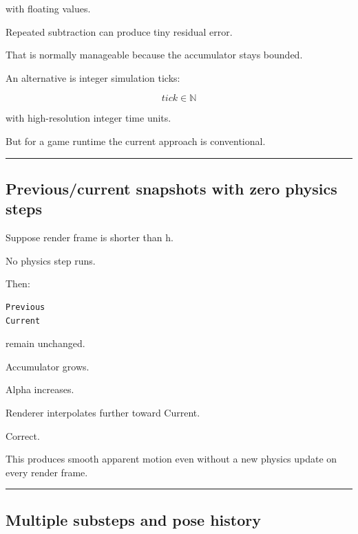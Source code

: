 with floating values.

Repeated subtraction can produce tiny residual error.

That is normally manageable because the accumulator stays bounded.

An alternative is integer simulation ticks:

\[
tick\in\mathbb N
\]

with high-resolution integer time units.

But for a game runtime the current approach is conventional.

\begin{center}\rule{0.5\linewidth}{0.5pt}\end{center}

\subsection{Previous/current snapshots with zero physics steps}\label{06-engine-ii-ch038-previouscurrent-snapshots-with-zero-physics-steps}

\hypertarget{06-engine-ii-ch038-previouscurrent-snapshots-with-zero-physics-steps}{}

Suppose render frame is shorter than h.

No physics step runs.

Then:

\begin{verbatim}
Previous
Current
\end{verbatim}

remain unchanged.

Accumulator grows.

Alpha increases.

Renderer interpolates further toward Current.

Correct.

This produces smooth apparent motion even without a new physics update on every render frame.

\begin{center}\rule{0.5\linewidth}{0.5pt}\end{center}

\subsection{Multiple substeps and pose history}\label{06-engine-ii-ch038-multiple-substeps-and-pose-history}

\hypertarget{06-engine-ii-ch038-multiple-substeps-and-pose-history}{}

